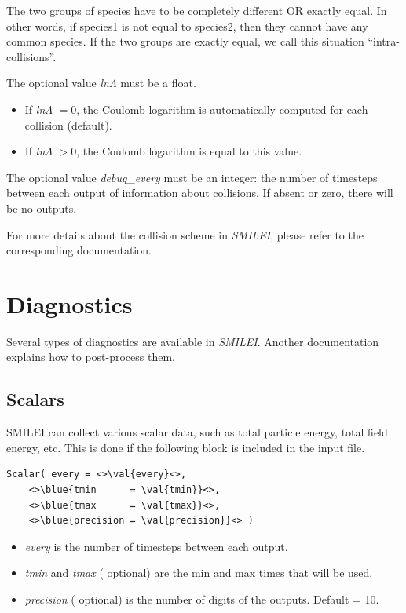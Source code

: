 \documentclass[11pt]{article}
\newcommand{\code}[1]{\colorbox{yellow!15}{\ttfamily #1}}
\newcommand{\val}[1]{{\ttfamily \textit{#1}}}
\newcommand{\blue}[1]{{\color{blue} #1}}
\newcommand{\smilei}{\emph{SMILEI}\xspace}
\begin{document}
The two groups of species have to be \underline{completely different} OR \underline{exactly equal}.
In other words, if \code{species1} is not equal to \code{species2}, then they cannot have any common species.
If the two groups are exactly equal, we call this situation ``intra-collisions''.

The \blue{optional} value \val{ln$\Lambda$} must be a float.\vspace{-10pt}
\begin{itemize}
	\item If \val{ln$\Lambda$} $=0$, the Coulomb logarithm is automatically computed for each collision (default).
	\item If \val{ln$\Lambda$} $>0$, the Coulomb logarithm is equal to this value.
\end{itemize}

The \blue{optional} value \val{debug\_every} must be an integer: the number of timesteps between
each output of information about collisions. If absent or zero, there will be no outputs.

For more details about the collision scheme in \smilei, please refer to the corresponding documentation.



\section{Diagnostics}
Several types of diagnostics are available in \smilei. Another documentation explains how to post-process them.

\subsection{Scalars\label{sec:scalars}}

SMILEI can collect various scalar data, such as total particle energy, total field energy, etc.
This is done if the following block is included in the input file.

\begin{lstlisting}
Scalar( every = <>\val{every}<>,
	<>\blue{tmin      = \val{tmin}}<>,
	<>\blue{tmax      = \val{tmax}}<>,
	<>\blue{precision = \val{precision}}<> )
\end{lstlisting}
\vspace{-1em}
\begin{itemize}
\item\val{every} is the number of timesteps between each output.
\item\val{tmin} and \val{tmax} (\blue{optional}) are the min and max times that will be used.
\item\val{precision} (\blue{optional}) is the number of digits of the outputs. Default = 10.
\end{itemize}
\end{document}
